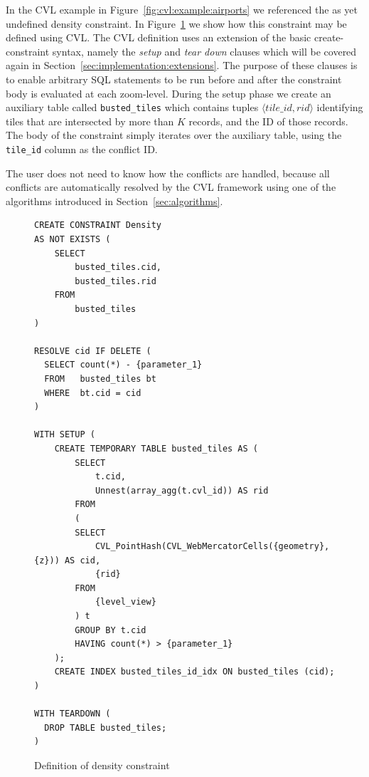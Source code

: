 In the CVL example in Figure~\ref{fig:cvl:example:airports} we referenced the as yet undefined density constraint. In Figure~\ref{fig:density:definition} we show how this constraint may be defined using CVL. The CVL definition uses an extension of the basic create-constraint syntax, namely the \emph{setup} and \emph{tear down} clauses which will be covered again in Section~\ref{sec:implementation:extensions}. The purpose of these clauses is to enable arbitrary SQL statements to be run before and after the constraint body is evaluated at each zoom-level. During the setup phase we create an auxiliary table called \texttt{busted\_tiles} which contains tuples $\langle tile\_id, rid \rangle$ identifying tiles that are intersected by more than $K$ records, and the ID of those records. The body of the constraint simply iterates over the auxiliary table, using the \texttt{tile\_id} column as the conflict ID.

The user does not need to know how the conflicts are handled, because all conflicts are automatically resolved by the CVL framework using one of the algorithms introduced in Section~\ref{sec:algorithms}.


\begin{figure}[htbp]
\begin{center}
\begin{lstlisting}
CREATE CONSTRAINT Density
AS NOT EXISTS (
    SELECT
        busted_tiles.cid,
        busted_tiles.rid
    FROM
        busted_tiles
)

RESOLVE cid IF DELETE (
  SELECT count(*) - {parameter_1}
  FROM   busted_tiles bt
  WHERE  bt.cid = cid
)

WITH SETUP (
    CREATE TEMPORARY TABLE busted_tiles AS (
        SELECT
            t.cid,
            Unnest(array_agg(t.cvl_id)) AS rid
        FROM
        (
        SELECT
            CVL_PointHash(CVL_WebMercatorCells({geometry}, {z})) AS cid,
            {rid}
        FROM
            {level_view}
        ) t
        GROUP BY t.cid
        HAVING count(*) > {parameter_1}
    );
    CREATE INDEX busted_tiles_id_idx ON busted_tiles (cid);
)

WITH TEARDOWN (
  DROP TABLE busted_tiles;
)
\end{lstlisting}
\caption{Definition of density constraint}
\label{fig:density:definition}
\end{center}
\end{figure}


